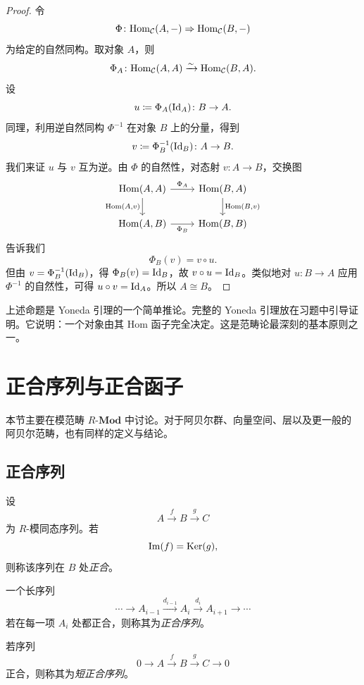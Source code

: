 \begin{proof}
令
\[
  \Phi\colon \mathrm{Hom}_{\mathcal C}(A,-)\Rightarrow \mathrm{Hom}_{\mathcal C}(B,-)
\]
为给定的自然同构。取对象 $A$，则
\[
  \Phi_A\colon \mathrm{Hom}_{\mathcal C}(A,A)\xrightarrow{\sim} \mathrm{Hom}_{\mathcal C}(B,A).
\]
设
\[
  u\coloneqq \Phi_A(\mathrm{Id}_A)\colon B\to A.
\]
同理，利用逆自然同构 $\Phi^{-1}$ 在对象 $B$ 上的分量，得到
\[
  v\coloneqq \Phi^{-1}_B(\mathrm{Id}_B)\colon A\to B.
\]
我们来证 $u$ 与 $v$ 互为逆。由 $\Phi$ 的自然性，对态射 $v\colon A\to B$，交换图
\[
\begin{tikzcd}
\Hom(A,A) \arrow[r,"{\Phi_A}"] \arrow[d,"{\Hom(A,v)}"'] & \Hom(B,A) \arrow[d,"{\Hom(B,v)}"] \\
\Hom(A,B) \arrow[r,"{\Phi_B}"'] & \Hom(B,B)
\end{tikzcd}
\]
告诉我们
\[
  \Phi_B(v)=v\circ u.
\]
但由 $v=\Phi_B^{-1}(\mathrm{Id}_B)$，得 $\Phi_B(v)=\mathrm{Id}_B$，故 $v\circ u=\mathrm{Id}_B$。类似地对 $u\colon B\to A$ 应用 $\Phi^{-1}$ 的自然性，可得 $u\circ v=\mathrm{Id}_A$。所以 $A\cong B$。
\end{proof}

\begin{remark}
上述命题是 Yoneda 引理的一个简单推论。完整的 Yoneda 引理放在习题中引导证明。它说明：一个对象由其 Hom 函子完全决定。这是范畴论最深刻的基本原则之一。
\end{remark}

\section{正合序列与正合函子}

本节主要在模范畴 $R\text{-}\mathbf{Mod}$ 中讨论。对于阿贝尔群、向量空间、层以及更一般的阿贝尔范畴，也有同样的定义与结论。

\subsection{正合序列}

\begin{definition}
设
\[
  A \xrightarrow{f} B \xrightarrow{g} C
\]
为 $R$-模同态序列。若
\[
  \mathrm{Im}(f)=\mathrm{Ker}(g),
\]
则称该序列在 $B$ 处\emph{正合}。

一个长序列
\[
  \cdots \to A_{i-1}\xrightarrow{d_{i-1}}A_i\xrightarrow{d_i}A_{i+1}\to \cdots
\]
若在每一项 $A_i$ 处都正合，则称其为\emph{正合序列}。
\end{definition}

\begin{definition}
若序列
\[
  0\longrightarrow A\xrightarrow{f} B\xrightarrow{g} C\longrightarrow 0
\]
正合，则称其为\emph{短正合序列}。
\end{definition}

